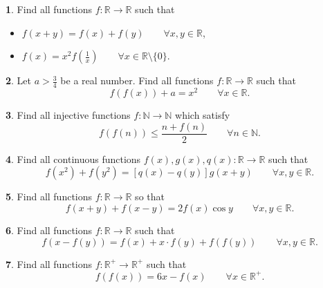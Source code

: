 \documentclass{article}
\newcommand{\plus}{+}
\newcommand{\equal}{=}
\theoremstyle{definition}
\newtheorem{p}{}
\begin{document}
\begin{p}
Find all functions $ f: \mathbb R \to \mathbb R$ such that
\begin{itemize}
\item $ f(x\plus{}y)\equal{}f(x)\plus{}f(y) \qquad \forall x,y \in \mathbb R$,
\item $ f(x)\equal{}x^2f(\frac{1}{x}) \qquad \forall x \in \mathbb R \setminus \{ 0 \} $.
\end{itemize}
\end{p}



\begin{p}
Let $ a>\frac{3}{4}$ be a real number. Find all functions $ f: \mathbb R \to \mathbb R$ such that
\[f(f(x))\plus{}a\equal{}x^2 \qquad \forall x \in \mathbb R.\]
\end{p}






\begin{p}
Find all injective functions $ f : \mathbb{N}\to\mathbb{N}$  which satisfy
\[ f(f(n))\leq \frac{n\plus{}f(n)}{2}\qquad \forall n\in\mathbb{N}.\]
\end{p}

\begin{p}
Find all continuous functions $f(x), g(x), q(x) : \mathbb R \to \mathbb R$ such that
\[f(x^2) + f(y^2) = [q(x) - q(y) ]g(x + y) \qquad  \forall x,y \in \mathbb R.\]
\end{p}







\begin{p}
Find all functions $f: \mathbb R\to\mathbb R$ so that 
\[f(x+y)+f(x-y)=2f(x)\cos y \qquad \forall x,y \in \mathbb R.\]
\end{p}



\begin{p}
Find all functions $ f: \mathbb R \to \mathbb R$ such that
\[f(x-f(y))=f(x)+x \cdot f(y)+f(f(y)) \qquad \forall x,y \in \mathbb R.\]
\end{p}



\begin{p}
Find all functions $ f: \mathbb R^+ \to \mathbb R^+$ such that
\[f(f(x))=6x-f(x) \qquad \forall x \in \mathbb R^+.\]
\end{p}
\end{document}
